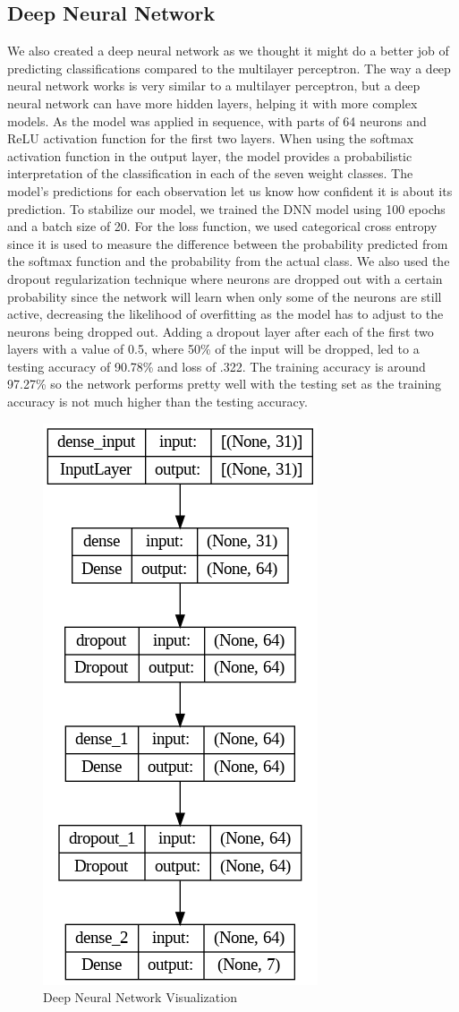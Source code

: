 \documentclass[11pt]{article}
\begin{document}
    \subsection{Deep Neural Network}
    We also created a deep neural network as we thought it might do a better job of predicting classifications compared to the multilayer perceptron. The way a deep neural network works is very similar to a multilayer perceptron, but a deep neural network can have more hidden layers, helping it with more complex models. As the model was applied in sequence, with parts of 64 neurons and ReLU activation function for the first two layers. When using the softmax activation function in the output layer, the model provides a probabilistic interpretation of the classification in each of the seven weight classes. The model's predictions for each observation let us know how confident it is about its prediction. To stabilize our model, we trained the DNN model using 100 epochs and a batch size of 20. For the loss function, we used categorical cross entropy since it is used to measure the difference between the probability predicted from the softmax function and the probability from the actual class. We also used the dropout regularization technique where neurons are dropped out with a certain probability since the network will learn when only some of the neurons are still active, decreasing the likelihood of overfitting as the model has to adjust to the neurons being dropped out. Adding a dropout layer after each of the first two layers with a value of 0.5, where 50\% of the input will be dropped, led to a testing accuracy of 90.78\% and loss of .322. The training accuracy is around 97.27\% so the network performs pretty well with the testing set as the training accuracy is not much higher than the testing accuracy.
    \begin{figure}[h]
        \centering
        \includegraphics[width=0.2\linewidth]{model_plot.png}
        \caption{Deep Neural Network Visualization}
        \label{fig:enter-label}
    \end{figure}
\end{document}
